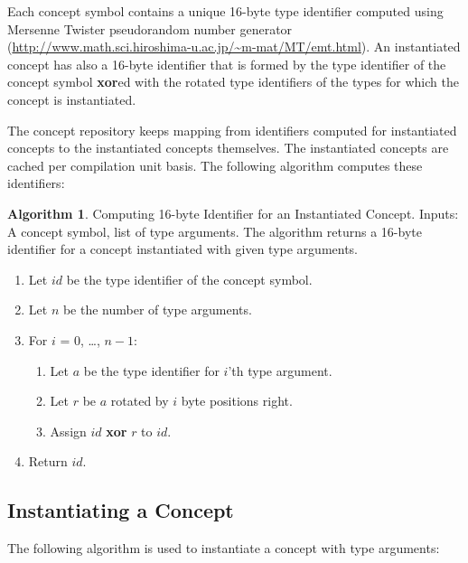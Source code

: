 \documentclass[a4paper,oneside,11pt]{book}
\theoremstyle{definition}
\newtheorem{algo}{Algorithm}[section]
\begin{document}
Each concept symbol contains a unique 16-byte type identifier computed using Mersenne Twister pseudorandom number generator
(\url{http://www.math.sci.hiroshima-u.ac.jp/~m-mat/MT/emt.html}).
An instantiated concept has also a 16-byte identifier that is formed by the type identifier of the concept symbol \textbf{xor}ed with the
rotated type identifiers of the types for which the concept is instantiated.

The concept repository keeps mapping from identifiers computed for instantiated concepts to the instantiated concepts themselves.
The instantiated concepts are cached per compilation unit basis.
The following algorithm computes these identifiers:

\begin{algo}\label{computeconceptid} Computing 16-byte Identifier for an Instantiated Concept. Inputs: A concept symbol, list of type arguments.
The algorithm returns a 16-byte identifier for a concept instantiated with given type arguments.
\begin{enumerate}
\item
Let $id$ be the type identifier of the concept symbol.
\item
Let $n$ be the number of type arguments.
\item
For $i$ = 0, \ldots, $n - 1$:
\begin{enumerate}
\item
Let $a$ be the type identifier for $i$'th type argument.
\item
Let $r$ be $a$ rotated by $i$ byte positions right.
\item
Assign $id$ \textbf{xor} $r$ to $id$.
\end{enumerate}
\item
Return $id$.
\end{enumerate}
\end{algo}

\clearpage
\subsection{Instantiating a Concept}

The following algorithm is used to instantiate a concept with type arguments:
\end{document}
